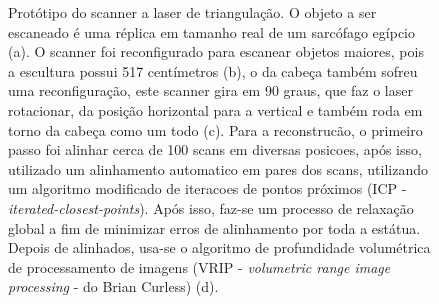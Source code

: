 \begin{figure}[!h]

\centering

\caption{%
   Protótipo do scanner a laser de triangulação. O objeto a ser escaneado é uma réplica em tamanho real
   de um sarcófago egípcio (a). O scanner foi reconfigurado para escanear objetos maiores, pois 
   a escultura possui 517 centímetros (b), o da cabeça também sofreu uma reconfiguração, este scanner gira em 90 graus, 
   que faz o laser rotacionar, da posição horizontal para a vertical e também roda em torno da cabeça como um todo (c).
   Para a reconstrucão, o primeiro passo foi alinhar cerca de 100 scans em diversas posicoes, após isso, utilizado um 
   alinhamento automatico em pares dos scans, utilizando um algoritmo modificado de iteracoes de pontos próximos 
   (ICP - \emph {iterated-closest-points}). Após isso, faz-se um processo de relaxação global a fim de minimizar erros 
   de alinhamento por toda a estátua. Depois de alinhados, usa-se o algoritmo de profundidade volumétrica de 
   processamento de imagens (VRIP - \emph {volumetric range image processing} - do Brian Curless) (d).
	}\label{fig:david}
\end{figure}

